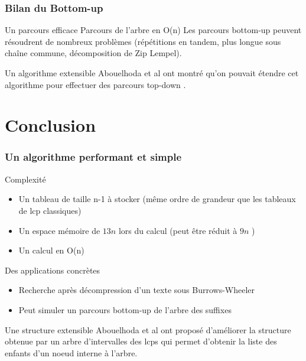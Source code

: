 \documentclass[10pt]{beamer}
\begin{document}
\begin{frame}
  \frametitle{Bilan du Bottom-up}

  \begin{block}{Un parcours efficace}
    Parcours de l'arbre en O(n)
    Les parcours bottom-up peuvent résoudrent de nombreux problèmes
    (répétitions en tandem, plus longue sous chaîne commune,
    décomposition de Zip Lempel).
  \end{block}

  \begin{block}{Un algorithme extensible}
    Abouelhoda et al ont montré qu'on pouvait étendre cet algorithme
    pour effectuer des parcours top-down \cite{Abouelhoda200453}.
  \end{block}

\end{frame}



\section{Conclusion}
\label{sec:conclusion}

\begin{frame}
  \frametitle{Un algorithme performant et simple}

  \begin{block}{Complexité}
    \begin{itemize}
    \item Un tableau de taille n-1 à stocker (même ordre de grandeur que les
      tableaux de lcp classiques)
    \item Un espace mémoire de $13n $ lors du calcul (peut être réduit à $9n$ \cite{Manzini04})
    \item Un calcul en O(n)
    \end{itemize}
  \end{block}

  \pause

  \begin{block}{Des applications concrètes}
    \begin{itemize}
    \item Recherche après décompression d'un texte sous Burrows-Wheeler
    \item Peut simuler un parcours bottom-up de l'arbre des suffixes
    \end{itemize}
  \end{block}

  \pause

  \begin{block}{Une structure extensible}
    Abouelhoda et al \cite{Abouelhoda200453} ont proposé d'améliorer la structure obtenue par
    un arbre d'intervalles des lcps qui permet d'obtenir la liste des
    enfants d'un noeud interne à l'arbre.
  \end{block}

\end{frame}
\end{document}
